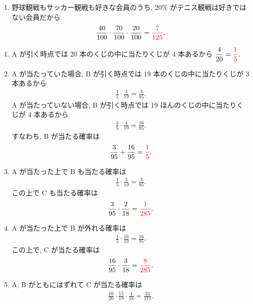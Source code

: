 \begin{qenumerate}
{\begin{enumerate}
{			}
			\item{
				野球観戦もサッカー観戦も好きな会員のうち, 20\% がテニス観戦は好きではない会員だから
				\begin{align}
					\frac{40}{100}\cdot\frac{70}{100}\cdot\frac{20}{100} = \textcolor{red}{\frac{7}{125}}.
				\end{align}
			}
		\end{enumerate}
	}
	\item{
		\begin{enumerate}
			\item{
				A が引く時点では 20 本のくじの中に当たりくじが 4 本あるから $\dfrac{4}{20} = \textcolor{red}{\dfrac{1}{5}}$.
			}
			\item{
				A が当たっていた場合, B が引く時点では 19 本のくじの中に当たりくじが 3 本あるから
				\begin{align}
					\frac{1}{5}\cdot\frac{3}{19} = \frac{3}{95}.
				\end{align}
				A が当たっていない場合, B が引く時点では 19 ほんのくじの中に当たりくじが 4 本あるから
				\begin{align}
					\frac{4}{5}\cdot\frac{4}{19} = \frac{16}{95}.
				\end{align}
				すなわち, B が当たる確率は
				\begin{align}
					\frac{3}{95} + \frac{16}{95} = \textcolor{red}{\frac{1}{5}}.
				\end{align}
			}
			\item{
				A が当たった上で B も当たる確率は
				\begin{align}
					\frac{1}{5}\cdot\frac{3}{19} = \frac{3}{95}.
				\end{align}
				この上で C も当たる確率は
				\begin{align}
					\frac{3}{95}\cdot\frac{2}{18} = \textcolor{red}{\frac{1}{285}}.
				\end{align}
			}
			\item{
				A が当たった上で B が外れる確率は
				\begin{align}
					\frac{1}{5}\cdot\frac{16}{19} = \frac{16}{95}.
				\end{align}
				この上で, C が当たる確率は
				\begin{align}
					\frac{16}{95}\cdot\frac{3}{18} = \textcolor{red}{\frac{8}{285}}.
				\end{align}
			}
			\item{
				A, B がともにはずれて C が当たる確率は
				\begin{align}
					\frac{16}{20}\cdot\frac{15}{19}\cdot\frac{4}{18} = \frac{24}{171}.
				\end{align}
}
\end{enumerate}}
\end{qenumerate}

